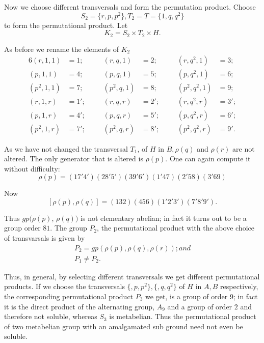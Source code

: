 Now we choose different transversals and form the permutation
product. Choose 
$$
S_2 = \bigg\{ r, p, p^2 \bigg\}, T_2 = T = \bigg\{1, q, q^2 \bigg\}
$$
to form the permutational product. Let 
$$
K_2 = S_2 \times T_2 \times H.
$$

As before we rename the elements of $K_2$
\begin{alignat*}{6}
  (r, 1,1) & = 1;\quad & (r,q, 1) &= 2; &(r, q^2,  1) &= 3; \\
  (p, 1,1) & = 4 ; &(p,q, 1)& = 5;& (p, q^2,  1)& = 6; \\
  (p^2, 1,1) & = 7 ;\qquad  &(p^2,q, 1) &= 8;\qquad  & (p^2, q^2, 1)& = 9; \\
  (r, 1,r) & = 1'; &(r, q, r)& = 2'; &(r, q^2,  r)& = 3'; \\
  (p, 1,r) & = 4'; &(p, q, r)& = 5'; &(p, q^2,  r)& = 6'; \\
  (p^2, 1,r) & = 7'; &(p^2, q, r) &= 8'; &(p^2, q^2,  r)& = 9'. 
\end{alignat*}

As we have not changed the transversal $T_1$, of $H$ in $B, \rho(q)$
and $\rho(r)$ are not altered. The only generator that is altered is
$\rho(p)$. One can again compute it without difficulty: 
$$
\rho(p) = (17'4') (28' 5') (39' 6') (1' 47) (2' 58) (3' 69)
$$

Now
$$
[\rho(p), \rho(q)] = (132) (456) (1'2'3') (7'8'9').
$$

Thus $gp (\rho(p)$, $\rho(q))$ is not elementary abelian; in fact it
turns out to be a group order $81$. The group $P_2$, the permutational
product with the above choice of transvarsals is given by  
\begin{gather*}
  P_2 = gp (\rho(p), \rho(q),  \rho(r)); and \\
  P_1 \neq P_2.
\end{gather*}

Thus, in general, by selecting different transversals we get different
permutational products. If we choose the transversals $\bigg\{, p, p^2
\bigg\},  \bigg\{,  q, q^2 \bigg\}$ of $H$ in $A,B$ respectively, the
corresponding permutational product $P_3$ we get, is a group of order
$9$; in fact it is the direct product of the alternating group, $A_9$
and a group of order $2$ and therefore not soluble, whereas $S_3$ is
metabelian. Thus the permutational product of two metabelian group
with an amalgamated sub ground need not even be soluble. 

\section{}%

